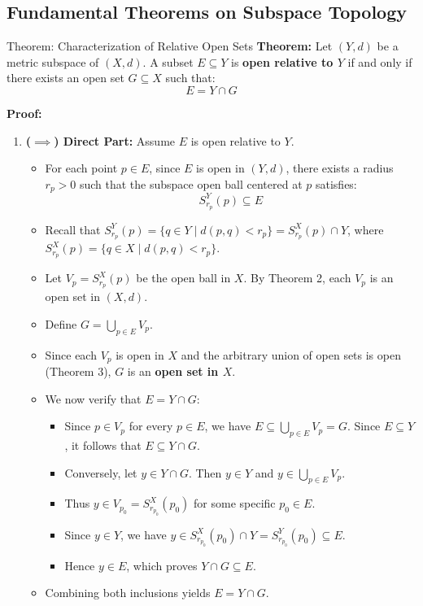 \documentclass[11pt,a4paper]{article}
\begin{document}
\newpage

\subsection{Fundamental Theorems on Subspace Topology}

\begin{exbox}{Theorem: Characterization of Relative Open Sets}
\textbf{Theorem:} Let $(Y, d)$ be a metric subspace of $(X, d)$. A subset $E \subseteq Y$ is \textbf{open relative to $Y$} if and only if there exists an open set $G \subseteq X$ such that:
\begin{equation}
    E = Y \cap G
\end{equation}

\textbf{Proof:}
\begin{enumerate}
    \item \textbf{($\implies$) Direct Part:} Assume $E$ is open relative to $Y$.
    \begin{itemize}
        \item For each point $p \in E$, since $E$ is open in $(Y, d)$, there exists a radius $r_p > 0$ such that the subspace open ball centered at $p$ satisfies:
        \begin{equation}
            S_{r_p}^Y(p) \subseteq E
        \end{equation}
        \item Recall that $S_{r_p}^Y(p) = \{ q \in Y \mid d(p, q) < r_p \} = S_{r_p}^X(p) \cap Y$, where $S_{r_p}^X(p) = \{ q \in X \mid d(p, q) < r_p \}$.
        \item Let $V_p = S_{r_p}^X(p)$ be the open ball in $X$. By Theorem 2, each $V_p$ is an open set in $(X, d)$.
        \item Define $G = \bigcup_{p \in E} V_p$.
        \item Since each $V_p$ is open in $X$ and the arbitrary union of open sets is open (Theorem 3), $G$ is an \textbf{open set in $X$}.
        \item We now verify that $E = Y \cap G$:
        \begin{itemize}
            \item Since $p \in V_p$ for every $p \in E$, we have $E \subseteq \bigcup_{p \in E} V_p = G$. Since $E \subseteq Y$, it follows that $E \subseteq Y \cap G$.
            \item Conversely, let $y \in Y \cap G$. Then $y \in Y$ and $y \in \bigcup_{p \in E} V_p$.
            \item Thus $y \in V_{p_0} = S_{r_{p_0}}^X(p_0)$ for some specific $p_0 \in E$.
            \item Since $y \in Y$, we have $y \in S_{r_{p_0}}^X(p_0) \cap Y = S_{r_{p_0}}^Y(p_0) \subseteq E$.
            \item Hence $y \in E$, which proves $Y \cap G \subseteq E$.
        \end{itemize}
        \item Combining both inclusions yields $E = Y \cap G$.
    \end{itemize}
    

\end{enumerate}
\end{exbox}
\end{document}

